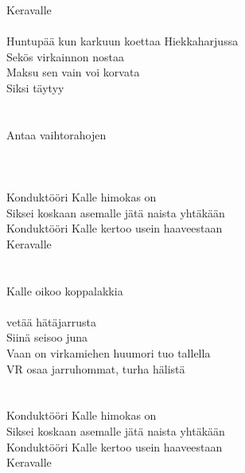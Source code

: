      Keravalle \\
\hspace{10mm} \\
Huntupää kun karkuun koettaa Hiekkaharjussa\\
Sekös virkainnon nostaa \\
Maksu  sen vain voi korvata\\
Siksi täytyy \\
\hspace{10mm}\\
\\
Antaa vaihtorahojen\\
\\
\\
\hspace{10mm}\\
    Konduktööri Kalle himokas on \\
    Siksei koskaan asemalle jätä naista yhtäkään\\
    Konduktööri Kalle kertoo usein haaveestaan\\
     Keravalle \\
\hspace{10mm} \\
\\
Kalle  oikoo koppalakkia\\
\\
 vetää hätäjarrusta\\
\hspace{10mm}
Siinä seisoo juna \\
Vaan on virkamiehen huumori tuo tallella\\
VR osaa jarruhommat, turha hälistä\\
\\
\hspace{10mm}\\
    Konduktööri Kalle himokas on \\
    Siksei koskaan asemalle jätä naista yhtäkään\\
    Konduktööri Kalle kertoo usein haaveestaan\\
     Keravalle \\

